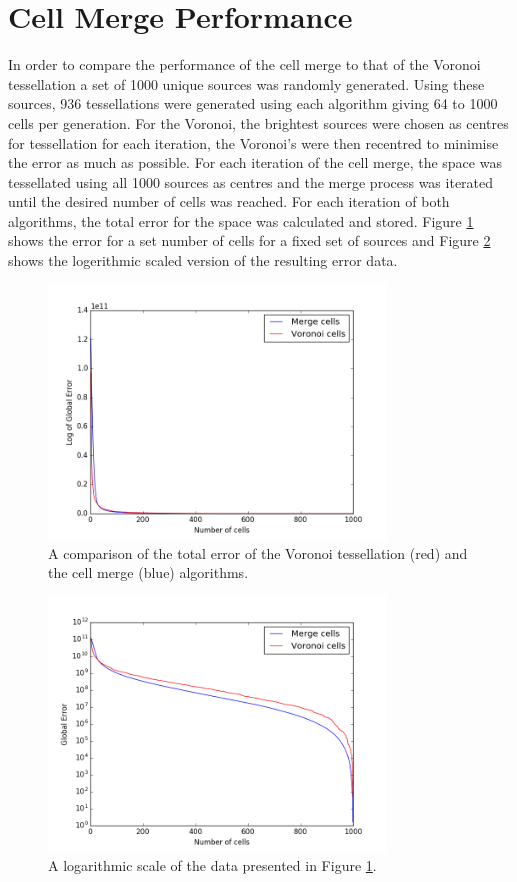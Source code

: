 \section{Cell Merge Performance}
In order to compare the performance of the cell merge to that of the Voronoi tessellation a set of 1000 unique sources was randomly generated. Using these sources, 936 tessellations were generated using each algorithm giving 64 to 1000 cells per generation. For the Voronoi, the brightest sources were chosen as centres for tessellation for each iteration, the Voronoi's were then recentred to minimise the error as much as possible. For each iteration of the cell merge, the space was tessellated using all 1000 sources as centres and the merge process was iterated until the desired number of cells was reached. For each iteration of both algorithms, the total error for the space was calculated and stored. Figure \ref{res:fig:error} shows the error for a set number of cells for a fixed set of sources and Figure \ref{res:fig:error_log} shows the logerithmic scaled version of the resulting error data.
\begin{figure}[H]
\centering
\includegraphics[width=0.8\textwidth]{Images/result_error.png}
\caption{A comparison of the total error of the Voronoi tessellation (red) and the cell merge (blue) algorithms.}
\label{res:fig:error}
\end{figure}
\begin{figure}[H]
\centering
\includegraphics[width=0.8\textwidth]{Images/result_error_log.png}
\caption{A logarithmic scale of the data presented in Figure \ref{res:fig:error}.}
\label{res:fig:error_log}
\end{figure}

